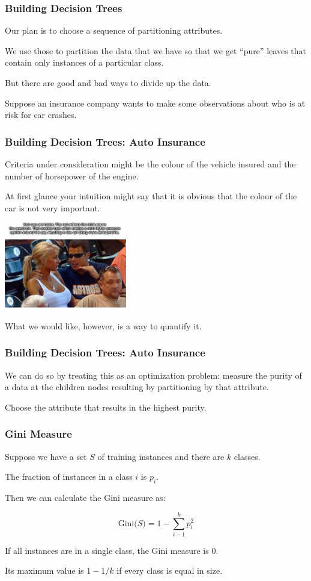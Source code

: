 \begin{frame}
\frametitle{Building Decision Trees}

Our plan is to choose a sequence of partitioning attributes. 

We use those to partition the data that we have so that we get ``pure'' leaves that contain only instances of a particular class. 

But there are good and bad ways to divide up the data. 

Suppose an insurance company wants to make some observations about who is at risk for car crashes. 

\end{frame}

\begin{frame}
\frametitle{Building Decision Trees: Auto Insurance}

Criteria under consideration might be the colour of the vehicle insured and the number of horsepower of the engine. 

At first glance your intuition might say that it is obvious that the colour of the car is not very important.

\begin{center}
	\includegraphics[width=0.4\textwidth]{images/redcar.png}
\end{center}

What we would like, however, is a way to quantify it.

\end{frame}

\begin{frame}
\frametitle{Building Decision Trees: Auto Insurance}

We can do so by treating this as an optimization problem: measure the purity of a data at the children nodes resulting by partitioning by that attribute. 

Choose the attribute that results in the highest purity.

\end{frame}

\begin{frame}
\frametitle{Gini Measure}

Suppose we have a set $S$ of training instances and there are $k$ classes. 

The fraction of instances in a class $i$ is $p_{i}$. 

Then we can calculate the Gini measure as:


$$\mbox{Gini($S$)} = 1 - \sum_{i-1}^{k}p_{i}^{2}$$

If all instances are in a single class, the Gini measure is 0.

Its maximum value is $1-1/k$ if every class is equal in size.

\end{frame}


